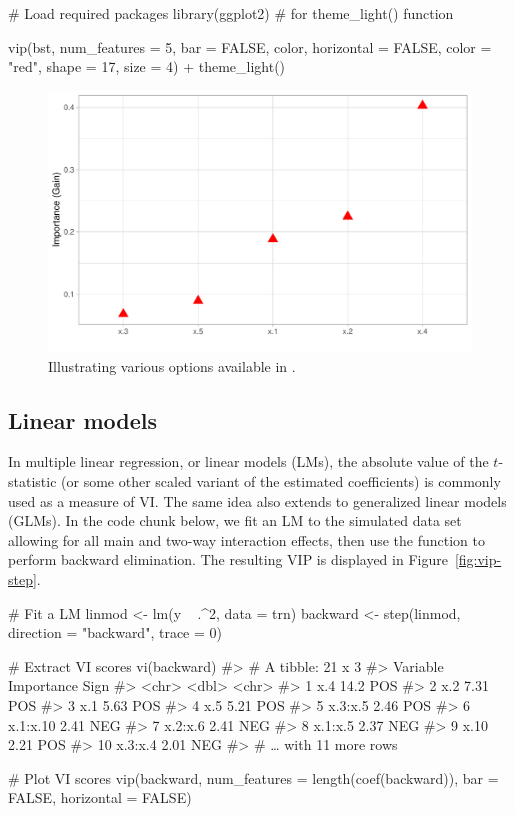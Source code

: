 \begin{example}
# Load required packages
library(ggplot2)  # for theme_light() function

vip(bst, num_features = 5, bar = FALSE, color, horizontal = FALSE, 
    color = "red", shape = 17, size = 4) +
  theme_light()
\end{example}

\begin{figure}[!htb]
  \centering 
  \includegraphics[width=1\linewidth]{figures/dot-plot} 
  \caption{Illustrating various options available in .}
  \label{fig:dot-plot}
\end{figure}


\subsection{Linear models}

In multiple linear regression, or linear models (LMs), the absolute value of the $t$-statistic (or some other scaled variant of the estimated coefficients) is commonly used as a measure of VI. The same idea also extends to generalized linear models (GLMs). In the code chunk below, we fit an LM to the simulated  data set allowing for all main and two-way interaction effects, then use the  function to perform backward elimination. The resulting VIP is displayed in Figure~\ref{fig:vip-step}.

\begin{example}
# Fit a LM
linmod <- lm(y ~ .^2, data = trn)
backward <- step(linmod, direction = "backward", trace = 0)

# Extract VI scores
vi(backward)
#> # A tibble: 21 x 3
#>    Variable Importance Sign 
#>    <chr>         <dbl> <chr>
#>  1 x.4           14.2  POS  
#>  2 x.2            7.31 POS  
#>  3 x.1            5.63 POS  
#>  4 x.5            5.21 POS  
#>  5 x.3:x.5        2.46 POS  
#>  6 x.1:x.10       2.41 NEG  
#>  7 x.2:x.6        2.41 NEG  
#>  8 x.1:x.5        2.37 NEG  
#>  9 x.10           2.21 POS  
#> 10 x.3:x.4        2.01 NEG  
#> # … with 11 more rows

# Plot VI scores
vip(backward, num_features = length(coef(backward)), 
    bar = FALSE, horizontal = FALSE)
\end{example}

